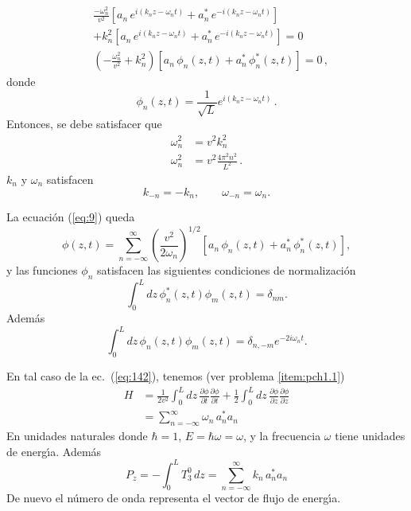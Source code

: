 \begin{align}
  &\frac{-\omega_n^2}{v^2}\left[
      a_n\,e^{i(k_nz-\omega_n t)}+a_n^*\,e^{-i(k_nz-\omega_n t)}\right]\nonumber\\
  &+k_n^2\left[
      a_n\,e^{i(k_nz-\omega_n t)}+a_n^*\,e^{-i(k_nz-\omega_n t)}\right]=0\nonumber\\
&\left(-\frac{\omega_n^2}{v^2}+k_n^2\right)  
  \left[
    a_n\,\phi_n(z,t)+a_n^*\,\phi_n^*(z,t)
  \right]=0\,,
\end{align}
donde
\begin{equation}
   \phi_n(z,t)=\frac{1}{\sqrt{L}}e^{i(k_nz-\omega_nt)}\,.
\end{equation}
Entonces, se debe satisfacer que
\begin{align}
  \label{eq:10}
  \omega_n^2&=v^2k_n^2\nonumber\\
\omega_n^2&=v^2\frac{4\pi^2 n^2}{L^2}\,.
\end{align}
$k_n$ y $\omega_n$ satisfacen
\begin{equation}
  k_{-n}=-k_n,\qquad \omega_{-n}=\omega_n.
\end{equation}

La ecuaci\'on (\ref{eq:9}) queda
\begin{equation}
   \phi(z,t)=\sum_{n=-\infty}^\infty 
  \left(
    \frac{v^2}{2\omega_n}
  \right)^{1/2}
  \left[
    a_n\,\phi_n(z,t)+a_n^*\,\phi_n^*(z,t)
  \right],
\end{equation}
y las funciones $\phi_n$ satisfacen las siguientes condiciones de normalizaci\'on
\begin{equation}
  \int_0^Ldz\,\phi_n^*(z,t)\phi_m(z,t)=\delta_{nm}.
\end{equation}
Adem\'as
\begin{equation}
  \int_0^Ldz\,\phi_n(z,t)\phi_m(z,t)=\delta_{n,-m}e^{-2i\omega_nt}.
\end{equation}

En tal caso de la ec.~(\ref{eq:142}), tenemos (ver problema \ref{item:pch1.1})
\begin{align}
\label{eq:237}
  H&=\frac{1}{2v^2}\int_0^Ldz\,\frac{\partial\phi}{\partial t}\frac{\partial\phi}{\partial t}+
  \frac{1}{2}\int_0^Ldz\,\frac{\partial\phi}{\partial z}\frac{\partial\phi}{\partial z}\nonumber\\
&=\sum_{n=-\infty}^\infty\omega_n\,a_n^*a_n
\end{align}
En unidades naturales donde $\hbar=1$, $E=\hbar\omega=\omega$, y la frecuencia $\omega$ tiene unidades de energ\'\i a. Adem\'as
\begin{equation}
  \label{eq:236}
    P_z=-\int_0^L T^0_3\,dz=\sum_{n=-\infty}^\infty k_n\,a_n^*a_n
\end{equation}
De nuevo el n\'umero de onda representa el vector de flujo de energ\'\i a. 

